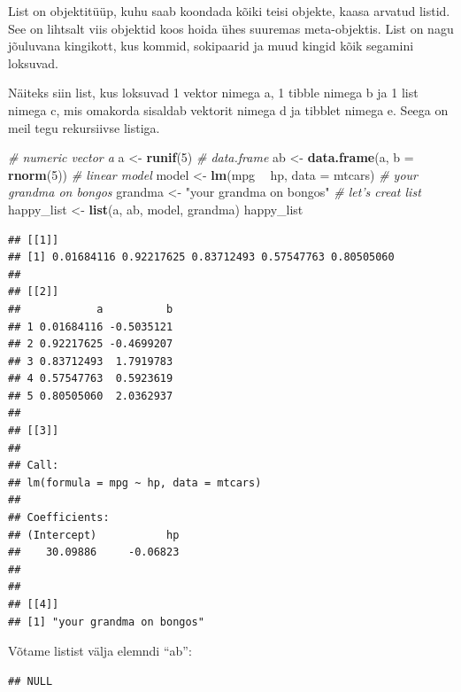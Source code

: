 \documentclass[]{book}
\newenvironment{Shaded}{\begin{snugshade}}{\end{snugshade}}
\newcommand{\KeywordTok}[1]{\textcolor[rgb]{0.13,0.29,0.53}{\textbf{#1}}}
\newcommand{\DataTypeTok}[1]{\textcolor[rgb]{0.13,0.29,0.53}{#1}}
\newcommand{\DecValTok}[1]{\textcolor[rgb]{0.00,0.00,0.81}{#1}}
\newcommand{\StringTok}[1]{\textcolor[rgb]{0.31,0.60,0.02}{#1}}
\newcommand{\CommentTok}[1]{\textcolor[rgb]{0.56,0.35,0.01}{\textit{#1}}}
\newcommand{\OperatorTok}[1]{\textcolor[rgb]{0.81,0.36,0.00}{\textbf{#1}}}
\newcommand{\NormalTok}[1]{#1}
\begin{document}
List on objektitüüp, kuhu saab koondada kõiki teisi objekte, kaasa
arvatud listid. See on lihtsalt viis objektid koos hoida ühes suuremas
meta-objektis. List on nagu jõuluvana kingikott, kus kommid, sokipaarid
ja muud kingid kõik segamini loksuvad.

Näiteks siin list, kus loksuvad 1 vektor nimega a, 1 tibble nimega b ja
1 list nimega c, mis omakorda sisaldab vektorit nimega d ja tibblet
nimega e. Seega on meil tegu rekursiivse listiga.

\begin{Shaded}
\begin{Highlighting}[]
\CommentTok{# numeric vector a}
\NormalTok{a <-}\StringTok{ }\KeywordTok{runif}\NormalTok{(}\DecValTok{5}\NormalTok{)}
\CommentTok{# data.frame}
\NormalTok{ab <-}\StringTok{ }\KeywordTok{data.frame}\NormalTok{(a, }\DataTypeTok{b =} \KeywordTok{rnorm}\NormalTok{(}\DecValTok{5}\NormalTok{))}
\CommentTok{# linear model}
\NormalTok{model <-}\StringTok{ }\KeywordTok{lm}\NormalTok{(mpg }\OperatorTok{~}\StringTok{ }\NormalTok{hp, }\DataTypeTok{data =}\NormalTok{ mtcars)}
\CommentTok{# your grandma on bongos}
\NormalTok{grandma <-}\StringTok{ "your grandma on bongos"}
\CommentTok{# let's creat list}
\NormalTok{happy_list <-}\StringTok{ }\KeywordTok{list}\NormalTok{(a, ab, model, grandma)}
\NormalTok{happy_list}
\end{Highlighting}
\end{Shaded}

\begin{verbatim}
## [[1]]
## [1] 0.01684116 0.92217625 0.83712493 0.57547763 0.80505060
## 
## [[2]]
##            a          b
## 1 0.01684116 -0.5035121
## 2 0.92217625 -0.4699207
## 3 0.83712493  1.7919783
## 4 0.57547763  0.5923619
## 5 0.80505060  2.0362937
## 
## [[3]]
## 
## Call:
## lm(formula = mpg ~ hp, data = mtcars)
## 
## Coefficients:
## (Intercept)           hp  
##    30.09886     -0.06823  
## 
## 
## [[4]]
## [1] "your grandma on bongos"
\end{verbatim}

Võtame listist välja elemndi ``ab'':

\begin{Shaded}
\end{Shaded}

\begin{verbatim}
## NULL
\end{verbatim}
\end{document}
